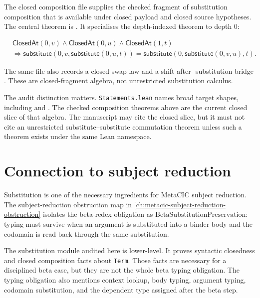 The closed composition file supplies the checked fragment of substitution
composition that is available under closed payload and closed source
hypotheses. The central theorem is
. It specialises
the depth-indexed theorem
 to
depth $0$:

$$
\begin{aligned}
  &\mathsf{ClosedAt}(0,v)
  \wedge
  \mathsf{ClosedAt}(0,u)
  \wedge
  \mathsf{ClosedAt}(1,t) \\
  &\Rightarrow
  \mathsf{substitute}(0,v,\mathsf{substitute}(0,u,t))
  =
  \mathsf{substitute}(0,\mathsf{substitute}(0,v,u),t).
\end{aligned}
$$

The same file also records a closed swap law
 and a shift-after-
substitution bridge
. These are
closed-fragment algebra, not unrestricted substitution calculus.

The audit distinction matters. \texttt{Statements.lean} names broad target
shapes, including  and
. The checked composition
theorems above are the current closed slice of that algebra. The manuscript
may cite the closed slice, but it must not cite an unrestricted
substitute--substitute commutation theorem unless such a theorem exists under
the same Lean namespace.

\section{Connection to subject reduction}
\label{sec:metacic-substitution-audit-map-subject-reduction}

Substitution is one of the necessary ingredients for MetaCIC subject
reduction. The subject-reduction obstruction map in
\autoref{ch:metacic-subject-reduction-obstruction} isolates the beta-redex
obligation as $\mathrm{BetaSubstitutionPreservation}$: typing must survive
when an argument is substituted into a binder body and the codomain is read
back through the same substitution.

The substitution module audited here is lower-level. It proves syntactic
closedness and closed composition facts about \texttt{Term}. Those facts are
necessary for a disciplined beta case, but they are not the whole beta typing
obligation. The typing obligation also mentions context lookup, body typing,
argument typing, codomain substitution, and the dependent type assigned after
the beta step.

